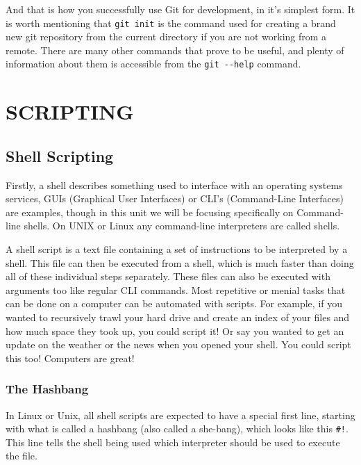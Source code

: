 And that is how you successfully use Git for development, in it's simplest form. It is worth mentioning that \texttt{git\ init} is the command used for creating a brand new git repository from the current directory if you are not working from a remote. There are many other commands that prove to be useful, and plenty of information about them is accessible from the \texttt{git\ -\/-help} command.

\pagebreak\hypertarget{scripting}{%
\section{SCRIPTING}\label{scripting}}

\hypertarget{shell-scripting}{%
\subsection{Shell Scripting}\label{shell-scripting}}

Firstly, a shell describes something used to interface with an operating systems services, GUIs (Graphical User Interfaces) or CLI's (Command-Line Interfaces) are examples, though in this unit we will be focusing specifically on Command-line shells. On UNIX or Linux any command-line interpreters are called shells.

A shell script is a text file containing a set of instructions to be interpreted by a shell. This file can then be executed from a shell, which is much faster than doing all of these individual steps separately. These files can also be executed with arguments too like regular CLI commands. Most repetitive or menial tasks that can be done on a computer can be automated with scripts. For example, if you wanted to recursively trawl your hard drive and create an index of your files and how much space they took up, you could script it! Or say you wanted to get an update on the weather or the news when you opened your shell. You could script this too! Computers are great!

\hypertarget{the-hashbang}{%
\subsubsection{The Hashbang}\label{the-hashbang}}

In Linux or Unix, all shell scripts are expected to have a special first line, starting with what is called a hashbang (also called a she-bang), which looks like this \texttt{\#!}. This line tells the shell being used which interpreter should be used to execute the file.

